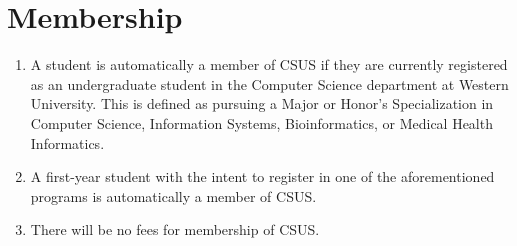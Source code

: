 \documentclass{article}
\begin{document}
\section{Membership}
\begin{enumerate}
	\item A student is automatically a member of CSUS if they are currently registered as an undergraduate student in the Computer Science department at Western University. This is defined as pursuing a Major or Honor's Specialization in Computer Science, Information Systems, Bioinformatics, or Medical Health Informatics.
	\item A first-year student with the intent to register in one of the aforementioned programs is automatically a member of CSUS.
	\item There will be no fees for membership of CSUS.
\end{enumerate}
\end{document}
